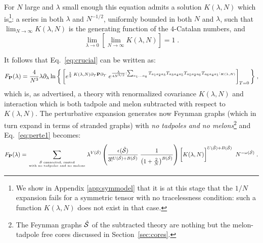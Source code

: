 \documentclass[10pt]{article}
\theoremstyle{plain}
\theoremstyle{definition}
\newcommand{\bP}{ {\bf P} }
\newcommand{\cS}{{\cal S}}
\newcommand{\be}{\begin{equation}}
\newcommand{\ee}{\end{equation}}
\begin{document}
For $N$ large and $\lambda$ small enough this equation admits a solution $K(\lambda,N)$ which is\footnote{We show in Appendix \ref{app:symmodel} that it is at this stage that the $1/N$ expansion 
fails for a symmetric tensor with no tracelessness condition: such a function $K(\lambda,N)$ does not exist in that case.}: a series in both $\lambda$ and $N^{-1/2}$, uniformly bounded in both $N$ and $\lambda$, such that
$\lim_{N\to \infty} K(\lambda,N)  $ is the generating function of the $4$-Catalan numbers, and
 \[ \lim_{\lambda \to 0} \left[  \lim_{N\to \infty} K(\lambda,N) \right] = 1 \;.\] 

It follows that Eq.~\eqref{eq:crucial} can be written as:
 \begin{align}\label{eq:crrrucial}
  F_{\bP}(\lambda) = \frac{4}{N^3} \lambda\partial_{\lambda} \ln \bigg\{
     \left[ e^{\frac{1}{2} \;   K (\lambda, N)  \partial_T \bP \partial_T   }      \; e^{  \frac{  \lambda  }{4 N^{3/2}}   
 :  \sum_{a_1\dots a_6}  T_{a_1a_2a_3}   T_{a_3a_4a_5}    T_{a_5 a_2 a_6}  T_{a_6a_4 a_1}:_{K(\lambda,N)} } \right]_{T=0}  
  \bigg\} \; ,
\end{align}
which is, as advertised, a theory with renormalized covariance $K (\lambda, N)$ and interaction which is both tadpole and melon subtracted
with respect to $K (\lambda, N)$. 
The perturbative expansion generates now Feynman graphs (which in turn expand in terms of stranded graphs) with \emph{no tadpoles and no melons}\footnote{The Feynman graphs $\hat \cS$ of 
 the subtracted theory are nothing but the melon-tadpole free cores discussed in  Section~\ref{sec:cores}.} and Eq.~\eqref{eq:perte1} becomes:
 \be\label{eq:rewrite}
 F_{\bP}(\lambda)  = \sum_{ \genfrac{}{}{0pt}{}{ \hat \cS  \text{ connected, rooted} }{  \text{with no tadpoles and no melons} } } \lambda^{ V (\hat \cS )} \left(  \frac{  \epsilon(\hat \cS )  }{3!^{U(\hat \cS ) + B(\hat \cS ) } } \; 
 \frac{ 1 }{ \left(  1 + \frac{2}{N} \right)^{ B(\hat \cS )} }  \right) \bigg[K(\lambda, N)  \bigg]^{U(\hat \cS ) + B(\hat \cS )}  
 \; \; N^{  - \omega(\hat \cS )} \;.
\ee
\end{document}
